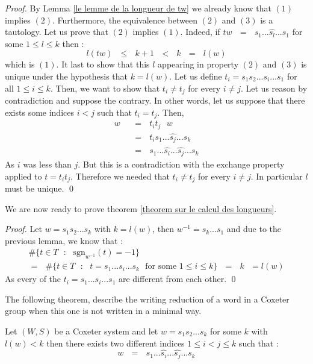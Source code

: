 \documentclass[envcountsame,envcountchap]{svmono}
\newcommand{\q}{\quad}
\newcommand{\qq}{\text{ }}
\begin{document}
\begin{proof}
	By Lemma \ref{le lemme de la longueur de tw} we already know that $(1)$ implies $(2)$. Furthermore, the equivalence between $(2)$ and $(3)$ is a tautology. Let us prove that $(2)$ implies $(1)$. Indeed, if $tw\qq=\qq s_1...\hat{s_l}...s_1$ for some $1\leq l\leq k$ then :
	\begin{equation}
	l(tw)\qq \leq \qq k+1\qq <\qq k \qq=\qq l(w)
	\end{equation} 
	which is $(1)$. It last to show that this $l$ appearing in property $(2)$ and $(3)$ is unique under the hypothesis that $k=l(w)$. Let us define $t_i=s_1s_2...s_i...s_1$ for all $1\leq i\leq k$. Then, we want to show that  $t_i\not=t_j$ for every $i\not=j$. Let us reason by contradiction and suppose the contrary. In other words, let us suppose that there exists some indices $i<j$ such that $t_i=t_j$. Then, 
	\begin{equation}
	\begin{split}
	w\qq&=\qq t_it_j\qq w\\
	&=\qq t_is_1...\hat{s_j}...s_k\\
	&=\qq s_1...\hat{s_i}...\hat{s_j}...s_k
	\end{split}
	\end{equation} 
	As $i$ was less than $j$. But this is a contradiction with the exchange property applied to $t=t_it_j$. Therefore we needed that $t_i\not=t_j$ for every $i\not=j$. In particular $l$ must be unique.
	\qed 
\end{proof}
We are now ready to prove theorem \ref{theorem sur le calcul des longueurs}. 
\begin{proof}
	Let $w=s_1s_2...s_k$ with $k=l(w)$, then $w^{-1}=s_k...s_1$ and due to the previous lemma, we know that :
	\begin{equation}
	\begin{split}
		\#\{t\in T\qq :\qq \mbox{sgn}_{w^{-1}}(t)=-1\}\qq\q\q\q\q\q\q\q \\
		=\qq \# \{t\in T\qq:\qq t=s_1...s_i...s_k\qq \mbox{for some }1\leq i\leq k\}\qq=\qq k\qq =l(w)
	\end{split}
	\end{equation}
	As every of the $t_i=s_1...s_i...s_1$ are different from each other. \qed
\end{proof}
The following theorem, describe the writing reduction of a word in a Coxeter group when this one is not written in a minimal way. 
\begin{theorem}
	Let $(W,S)$ be a Coxeter system and let $w=s_1s_2...s_k$ for some $k$ with $l(w)<k$ then there exists two different indices $1\leq i<j\leq k$ such that :
	\begin{equation}
	w\qq=\qq s_1...\hat{s_i}...\hat{s_j}...s_k
	\end{equation}
\end{theorem}
\end{document}

